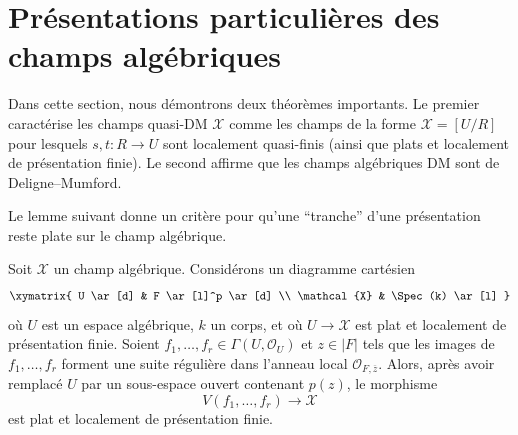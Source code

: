 \section{Présentations particulières des champs algébriques}
\label{section-presentations}

\noindent
Dans cette section, nous démontrons deux théorèmes importants.
Le premier caractérise les champs quasi-DM $\mathcal{X}$ comme les champs de
la forme $\mathcal{X} = [U/R]$ pour lesquels $s, t : R \to U$ sont localement
quasi-finis (ainsi que plats et localement de présentation finie).
Le second affirme que les champs algébriques DM sont de Deligne--Mumford.

\medskip\noindent
Le lemme suivant donne un critère pour qu'une ``tranche'' d'une présentation
reste plate sur le champ algébrique.

\begin{lemma}
\label{lemma-slice}
Soit $\mathcal{X}$ un champ algébrique.
Considérons un diagramme cartésien
$$
\xymatrix{
U \ar[d] & F \ar[l]^p \ar[d] \\
\mathcal{X} & \Spec(k) \ar[l]
}
$$
où $U$ est un espace algébrique, $k$ un corps, et où $U \to \mathcal{X}$
est plat et localement de présentation finie. Soient
$f_1, \ldots, f_r \in \Gamma(U, \mathcal{O}_U)$
et $z \in |F|$ tels que les images de $f_1, \ldots, f_r$ forment une suite
régulière dans l'anneau local $\mathcal{O}_{F, \overline{z}}$.
Alors, après avoir remplacé $U$ par un sous-espace ouvert contenant $p(z)$,
le morphisme
$$
V(f_1, \ldots, f_r) \longrightarrow \mathcal{X}
$$
est plat et localement de présentation finie.
\end{lemma}

